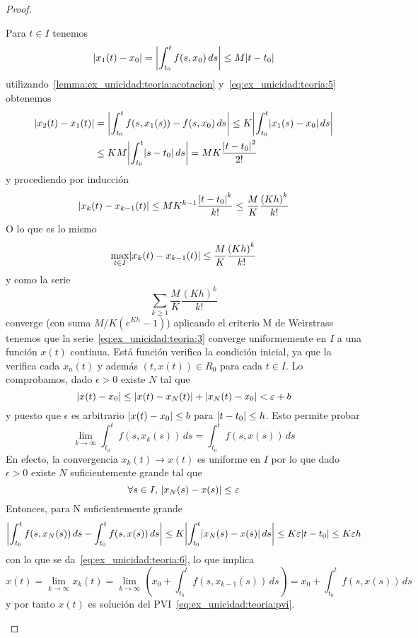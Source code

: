 \documentclass[../ecuaciones_diferenciales.tex]{subfiles}
\begin{document}
\begin{proof}
\begin{enumerate}[(a)]
        Para \(t \in I\) tenemos
        \begin{equation}\label{eq:ex_unicidad:teoria:5}
            \abs{x_1(t) - x_0} = \abs{\int_{t_0}^t f(s, x_0) \, ds} \leq M \abs{t - t_0}
        \end{equation}
        utilizando~\ref{lemma:ex_unicidad:teoria:acotacion} y~\ref{eq:ex_unicidad:teoria:5} obtenemos
        \begin{align*}
            \abs{x_2(t) - x_1(t)} 
                &= \abs{\int_{t_0}^t f(s, x_1(s)) - f(s, x_0) \, ds} 
                \leq K \abs{\int_{t_0}^t \abs{x_1(s) - x_0} \, ds} \\
                &\leq KM \abs{\int_{t_0}^t \abs{s - t_0} \, ds}
                = MK \frac{\abs{t - t_0}^2}{2!}
        \end{align*}
        y procediendo por inducción
        \begin{align*}
            \abs{x_k(t) - x_{k - 1}(t)} \leq M K^{k-1} \frac{\abs{t - t_0}^k}{k!} \leq \frac{M}{K} \frac{{(Kh)}^k}{k!}
        \end{align*}
        O lo que es lo mismo
        \[
            \max_{t \in I} \abs{x_k(t) - x_{k - 1}(t)} \leq \frac{M}{K} \frac{{(Kh)}^k}{k!}
        \]
        y como la serie
        \[
            \sum_{k \geq 1} \frac{M}{K} \frac{{(Kh)}^k}{k!}
        \]
        converge (con suma \(M/K (e^{Kh} - 1)\)) aplicando el criterio M de Weirstrass tenemos que la serie~\ref{eq:ex_unicidad:teoria:3}
        converge uniformemente en \(I\) a una función \(x(t)\) continua. Está función verifica la
        condición inicial, ya que la verifica cada \(x_n(t)\) y además \((t, x(t)) \in R_0\) para cada \(t \in I\).
        Lo comprobamos, dado \(\epsilon > 0\) existe \(N\) tal que
        \[
            \abs{x(t) - x_0} \leq \abs{x(t) - x_N(t)} + \abs{x_N(t) - x_0} < \epsilon + b
        \]
        y puesto que \(\epsilon\) es arbitrario \(\abs{x(t) - x_0} \leq b\) para \(\abs{t - t_0} \leq h\).
        Esto permite probar 
        \begin{equation} \label{eq:ex_unicidad:teoria:6}
            \lim_{k \to \infty} \int_{t_0}^t f(s, x_k(s)) \, ds = \int_{t_0}^t f(s, x(s)) \, ds
        \end{equation}
        En efecto, la convergencia \(x_k(t) \to x(t)\) es uniforme en \(I\) por lo que dado \(\epsilon > 0\) 
        existe \(N\) suficientemente grande tal que
        \[
            \forall s \in I, \, \abs{x_N(s) - x(s)} \leq \epsilon 
        \]
        Entonces, para N suficientemente grande
        \[
            \abs{\int_{t_0}^t f(s, x_N(s)) \, ds - \int_{t_0}^t f(s, x(s)) \, ds} 
                \leq K \abs{\int_{t_0}^t \abs{x_N(s) - x(s)} \, ds}
                \leq K \epsilon \abs{t - t_0}
                \leq K \epsilon h
        \]
        con lo que se da~\ref{eq:ex_unicidad:teoria:6}, lo que implica
        \[
            x(t) = \lim_{k \to \infty} x_{k}(t) = \lim_{k \to \infty} \left(x_0 + \int_{t_0}^t f(s, x_{k-1}(s)) \, ds\right)
            = x_0 + \int_{t_0}^t f(s, x(s)) \, ds
        \]
        y por tanto \(x(t)\) es solución del PVI~\ref{eq:ex_unicidad:teoria:pvi}.


\end{enumerate}
\end{proof}
\end{document}
